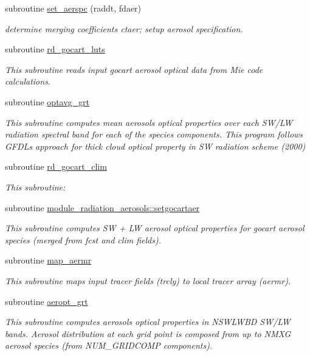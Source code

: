 \begin{DoxyCompactItemize}
subroutine \hyperlink{group__module__radiation__aerosols_gafb13b833ac59cf949702bdbde93d2c44}{set\+\_\+aerspc} (raddt, fdaer)
\begin{DoxyCompactList}\small\item\em determine merging coefficients ctaer; setup aerosol specification. \end{DoxyCompactList}\item 
subroutine \hyperlink{group__module__radiation__aerosols_ga8b6a882f91674d1c0f7f71f297a5f92e}{rd\+\_\+gocart\+\_\+luts}
\begin{DoxyCompactList}\small\item\em This subroutine reads input gocart aerosol optical data from Mie code calculations. \end{DoxyCompactList}\item 
subroutine \hyperlink{group__module__radiation__aerosols_ga8d1f5010e8cbc6abda50b8fc233ad7e9}{optavg\+\_\+grt}
\begin{DoxyCompactList}\small\item\em This subroutine computes mean aerosols optical properties over each S\+W/\+LW radiation spectral band for each of the species components. This program follows G\+F\+DL\textquotesingle{}s approach for thick cloud optical property in SW radiation scheme (2000) \end{DoxyCompactList}\item 
subroutine \hyperlink{group__module__radiation__aerosols_ga15bad8499ffd17d967e5788cd6721c4d}{rd\+\_\+gocart\+\_\+clim}
\begin{DoxyCompactList}\small\item\em This subroutine\+: \end{DoxyCompactList}\item 
subroutine \hyperlink{group__module__radiation__aerosols_ga685dc5ac4b7da2a375800bef712cbb8b}{module\+\_\+radiation\+\_\+aerosols\+::setgocartaer}
\begin{DoxyCompactList}\small\item\em This subroutine computes SW + LW aerosol optical properties for gocart aerosol species (merged from fcst and clim fields). \end{DoxyCompactList}\item 
subroutine \hyperlink{group__module__radiation__aerosols_ga651c4be2fa354238990c5c7b9488e9fd}{map\+\_\+aermr}
\begin{DoxyCompactList}\small\item\em This subroutine maps input tracer fields (trcly) to local tracer array (aermr). \end{DoxyCompactList}\item 
subroutine \hyperlink{group__module__radiation__aerosols_ga4ff866c545425e7029a11999e97d8faa}{aeropt\+\_\+grt}
\begin{DoxyCompactList}\small\item\em This subroutine computes aerosols optical properties in N\+S\+W\+L\+W\+BD S\+W/\+LW bands. Aerosol distribution at each grid point is composed from up to N\+M\+XG aerosol species (from N\+U\+M\+\_\+\+G\+R\+I\+D\+C\+O\+MP components). \end{DoxyCompactList}\end{DoxyCompactItemize}
